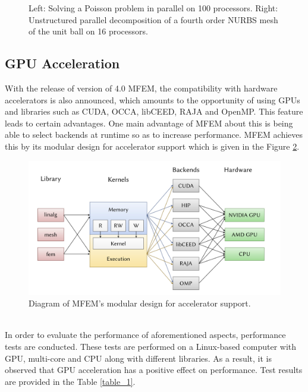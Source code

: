 \documentclass{article}
\begin{document}
\begin{figure}[hbt!]
\begin{subfigure}{0.4\textwidth}
\end{subfigure}
\caption{Left: Solving a Poisson problem in parallel on 100 processors. Right: Unstructured parallel decomposition of a fourth order NURBS mesh of the unit ball on 16 processors.}
\label{figure_2}
\end{figure}
\FloatBarrier
\subsection{GPU Acceleration}
With the release of version of 4.0 MFEM, the compatibility with hardware accelerators is also announced, which amounts to the opportunity of using GPUs and libraries such as CUDA, OCCA, libCEED, RAJA and OpenMP. This feature leads to certain advantages. One main advantage of MFEM about this is being able to select backends at runtime so as to increase performance. MFEM achieves this by its modular design for accelerator support which is given in the Figure \ref{figure_3}. 
\begin{figure}[hbt!]
    \centering
    \includegraphics[width=1.0\textwidth]{Figures/Figure_3.png}
    \caption{Diagram of MFEM’s modular design for accelerator support. }
    \label{figure_3}
\end{figure}
\\In order to evaluate the performance of aforementioned aspects, performance tests are conducted. These tests are performed on a Linux-based computer with GPU, multi-core and CPU along with different libraries. As a result, it is observed that GPU acceleration has a positive effect on performance. Test results are provided in the Table \ref{table_1}. 
\end{document}
